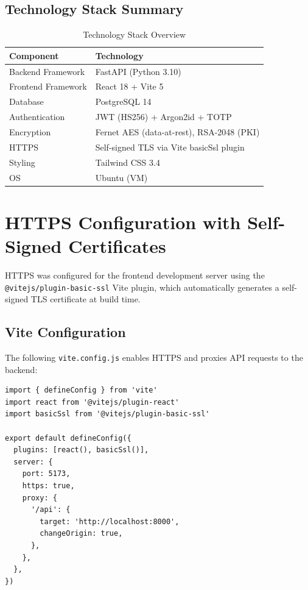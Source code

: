 \documentclass[12pt,a4paper]{article}
\begin{document}
\subsection{Technology Stack Summary}

\begin{table}[H]
\centering
\begin{tabular}{ll}
\toprule
\textbf{Component} & \textbf{Technology} \\
\midrule
Backend Framework & FastAPI (Python 3.10) \\
Frontend Framework & React 18 + Vite 5 \\
Database & PostgreSQL 14 \\
Authentication & JWT (HS256) + Argon2id + TOTP \\
Encryption & Fernet AES (data-at-rest), RSA-2048 (PKI) \\
HTTPS & Self-signed TLS via Vite basicSsl plugin \\
Styling & Tailwind CSS 3.4 \\
OS & Ubuntu (VM) \\
\bottomrule
\end{tabular}
\caption{Technology Stack Overview}
\end{table}

\newpage

\section{HTTPS Configuration with Self-Signed Certificates}

HTTPS was configured for the frontend development server using the \texttt{@vitejs/plugin-basic-ssl} Vite plugin, which automatically generates a self-signed TLS certificate at build time.

\subsection{Vite Configuration}

The following \texttt{vite.config.js} enables HTTPS and proxies API requests to the backend:

\begin{lstlisting}
import { defineConfig } from 'vite'
import react from '@vitejs/plugin-react'
import basicSsl from '@vitejs/plugin-basic-ssl'

export default defineConfig({
  plugins: [react(), basicSsl()],
  server: {
    port: 5173,
    https: true,
    proxy: {
      '/api': {
        target: 'http://localhost:8000',
        changeOrigin: true,
      },
    },
  },
})
\end{lstlisting}
\end{document}
